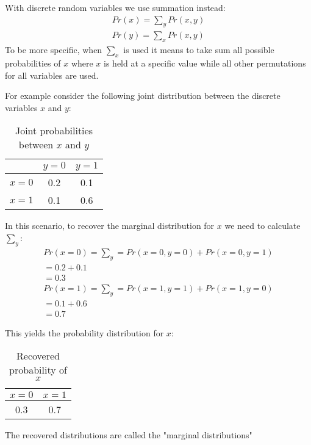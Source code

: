 \documentclass{article}
\begin{document}
With discrete random variables we use summation instead:
\begin{align*}
	Pr\left( x \right) = \sum_{y} Pr\left( x,y \right) \\
	Pr\left( y \right) = \sum_{x} Pr\left( x,y \right) 
\end{align*}
\noindent
To be more specific, when $\sum_{x}$ is used it means to take sum all possible probabilities of $x$ where $x$ is held at a specific value while all other permutations for all variables are used.

For example consider the following joint distribution between the discrete variables $x$ and $y$:

\begin{table}[htpb]
	\centering
	\caption{Joint probabilities between $x$ and $y$}
	\label{tab:joint}
	\begin{tabular}{ccc}
	 	 & $y=0$  & $y=1$ \\
		\hline
		$x=0$ \vline & 0.2 & 0.1 \\
		$x=1$ \vline & 0.1 & 0.6 \\
	\end{tabular}
\end{table}

In this scenario, to recover the marginal distribution for $x$ we need to calculate $\sum_{y}$:
\begin{align*}
	Pr\left( x=0 \right) =  \sum_{y}=Pr\left( x=0, y=0 \right) + Pr\left( x=0,y=1 \right) \\
	= 0.2 + 0.1 \\
	= 0.3
\end{align*}
\begin{align*}
	Pr\left( x=1 \right) = \sum_{y}=Pr\left( x=1,y=1 \right) + Pr\left( x=1,y=0 \right) \\
	= 0.1 + 0.6 \\
	= 0.7
\end{align*}

This yields the probability distribution for $x$:

\begin{table}[htpb]
	\centering
	\caption{Recovered probability of $x$}
	\label{tab:x-recover}
	\begin{tabular}{cc}
		$x=0$  & $x=1$ \\
		\hline
		0.3 & 0.7

	\end{tabular}
\end{table}

The recovered distributions are called the "marginal distributions"
\end{document}
